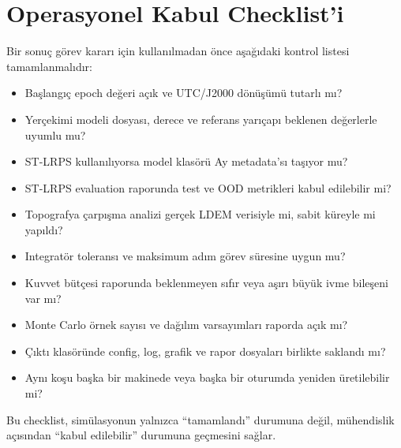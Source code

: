 \section{Operasyonel Kabul Checklist'i}
\label{sec:operational_checklist}

Bir sonuç görev kararı için kullanılmadan önce aşağıdaki kontrol listesi tamamlanmalıdır:

\begin{itemize}
    \item Başlangıç epoch değeri açık ve UTC/J2000 dönüşümü tutarlı mı?
    \item Yerçekimi modeli dosyası, derece ve referans yarıçapı beklenen değerlerle uyumlu mu?
    \item ST-LRPS kullanılıyorsa model klasörü Ay metadata'sı taşıyor mu?
    \item ST-LRPS evaluation raporunda test ve OOD metrikleri kabul edilebilir mi?
    \item Topografya çarpışma analizi gerçek LDEM verisiyle mi, sabit küreyle mi yapıldı?
    \item Integratör toleransı ve maksimum adım görev süresine uygun mu?
    \item Kuvvet bütçesi raporunda beklenmeyen sıfır veya aşırı büyük ivme bileşeni var mı?
    \item Monte Carlo örnek sayısı ve dağılım varsayımları raporda açık mı?
    \item Çıktı klasöründe config, log, grafik ve rapor dosyaları birlikte saklandı mı?
    \item Aynı koşu başka bir makinede veya başka bir oturumda yeniden üretilebilir mi?
\end{itemize}

Bu checklist, simülasyonun yalnızca ``tamamlandı'' durumuna değil, mühendislik açısından ``kabul edilebilir'' durumuna geçmesini sağlar.
